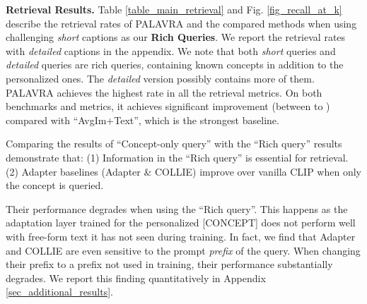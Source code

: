 \documentclass[runningheads]{llncs}
\newcommand{\figref}[1]{Fig. \ref{#1}}
\newcommand{\concept}{[CONCEPT]}
\begin{document}
\noindent\textbf{Retrieval Results.}
Table \ref{table_main_retrieval} and \figref{fig_recall_at_k} describe the retrieval rates of PALAVRA and the compared methods when using challenging \textit{short} captions as our \textbf{Rich Queries}. We report the retrieval rates with \textit{detailed} captions in the appendix. We note that both \textit{short} queries and \textit{detailed} queries are rich queries, containing known concepts in addition
to the personalized ones. The \textit{detailed} version possibly contains more of them. PALAVRA achieves  the highest rate in all the  retrieval metrics. On both benchmarks and metrics, it achieves significant improvement (between  to ) compared with ``AvgIm+Text'', which is the strongest baseline.

Comparing the results of ``Concept-only query'' with the ``Rich query'' results  demonstrate that: (1) Information in the ``Rich query'' is essential for retrieval.   (2) Adapter baselines (Adapter \& COLLIE) improve over vanilla CLIP when only the concept is queried.

 Their performance degrades when using the ``Rich query''. This happens as the adaptation layer trained for the personalized \concept{} does not perform well with free-form text it has not seen during training. In fact, we find that Adapter and COLLIE are even sensitive to the prompt \textit{prefix} of the query. When changing their prefix to a prefix not used in training, their performance substantially degrades. We report this finding quantitatively in Appendix \ref{sec_additional_results}.
\end{document}
